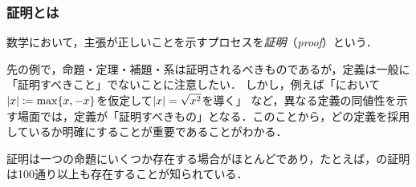 \subsubsection{証明とは}
数学において，主張が正しいことを示すプロセスを\emph{証明}（\emph{proof}）という．

先の例で，命題・定理・補題・系は証明されるべきものであるが，定義は一般に「証明すべきこと」でないことに注意したい．
しかし，例えば「において$\lvert x\rvert \coloneqq \max \{ x, -x \}$を仮定して$\lvert x\rvert = \sqrt{x^2}$を導く」
など，異なる定義の同値性を示す場面では，定義が「証明すべきもの」となる．このことから，どの定義を採用しているか明確にすることが重要であることがわかる．

証明は一つの命題にいくつか存在する場合がほとんどであり，たとえば，の証明は100通り以上も存在することが知られている．
